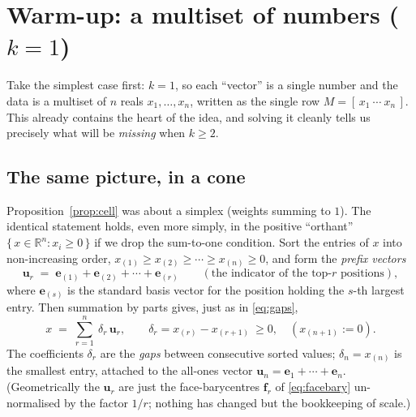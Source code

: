 \documentclass[11pt,a4paper]{article}
\theoremstyle{definition}
\theoremstyle{plain}
\newcommand{\R}{\mathbb{R}}
\newcommand{\bvec}[1]{\mathbf{#1}}
\begin{document}
\section{Warm-up: a multiset of numbers ($k=1$)}
\label{sec:numbers}

Take the simplest case first: $k=1$, so each ``vector'' is a single number and
the data is a multiset of $n$ reals $x_1,\dots,x_n$, written as the single row
$M=[\,x_1\ \cdots\ x_n\,]$. This already contains the heart of the idea, and
solving it cleanly tells us precisely what will be \emph{missing} when $k\ge2$.

\subsection{The same picture, in a cone}

Proposition~\ref{prop:cell} was about a simplex (weights summing to $1$). The
identical statement holds, even more simply, in the positive ``orthant''
$\{\,x\in\R^n:x_i\ge0\,\}$ if we drop the sum-to-one condition. Sort the entries
of $x$ into non-increasing order, $x_{(1)}\ge x_{(2)}\ge\cdots\ge x_{(n)}\ge0$,
and form the \emph{prefix vectors}
\[
   \bvec u_r \;=\; \bvec e_{(1)}+\bvec e_{(2)}+\cdots+\bvec e_{(r)}
   \qquad(\text{the indicator of the top-$r$ positions}),
\]
where $\bvec e_{(s)}$ is the standard basis vector for the position holding the
$s$-th largest entry. Then summation by parts gives, just as in
\eqref{eq:gaps},
\begin{equation}\label{eq:numdecomp}
   x \;=\; \sum_{r=1}^{n}\ \delta_r\,\bvec u_r,
   \qquad
   \delta_r=x_{(r)}-x_{(r+1)}\ \ge 0,\quad (x_{(n+1)}:=0).
\end{equation}
The coefficients $\delta_r$ are the \emph{gaps} between consecutive sorted
values; $\delta_n=x_{(n)}$ is the smallest entry, attached to the all-ones
vector $\bvec u_n=\bvec e_1+\cdots+\bvec e_n$. (Geometrically the $\bvec u_r$ are
just the face-barycentres $\bvec f_r$ of \eqref{eq:facebary} un-normalised by the
factor $1/r$; nothing has changed but the bookkeeping of scale.)
\end{document}
